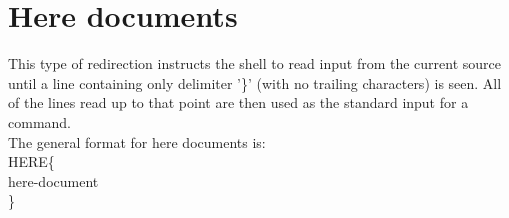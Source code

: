 \documentclass[12pt,a4paper]{report}
\begin{document}
\section*{Here documents}
This type of redirection instructs the shell to read input from the current source until a line containing only delimiter '\}' (with no trailing characters) is  seen.   All  of  the
lines read up to that point are then used as the standard input for a command.\\
\newline
The general format for here documents is:\\
\newline
\hspace*{7 mm}HERE\{\\
\hspace*{14 mm} here-document\\
\hspace*{7 mm} \}\\
\end{document}
